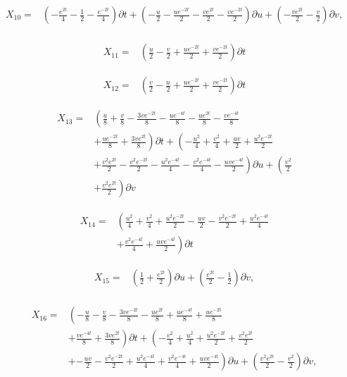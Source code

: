 \begin{align*}
X_{10}=&\left(- \frac{e^{2 t}}{4} - \frac{1}{2} - \frac{e^{- 2 t}}{4} \right)\partial t+\left(- \frac{u}{2} - \frac{u e^{- 2 t}}{2} - \frac{v e^{2 t}}{2} - \frac{v e^{- 2 t}}{2} \right)\partial u+\left(- \frac{v e^{2 t}}{2} - \frac{v}{2} \right)\partial v,\\
\end{align*}

\begin{align*}
X_{11}=&\left(\frac{u}{2}- \frac{v}{2}+\frac{u e^{- 2 t}}{2}+\frac{v e^{- 2 t}}{2} \right)\partial t
\end{align*}

\begin{align*}
X_{12}=&\left(\frac{v}{2}- \frac{u}{2}+\frac{u e^{- 2 t}}{2}+\frac{v e^{- 2 t}}{2} \right)\partial t
\end{align*}

\begin{align*}
X_{13}=&\left(\frac{u}{8}+\frac{v}{8}- \frac{3 v e^{- 2 t}}{8}- \frac{u e^{- 4 t}}{8}- \frac{u e^{2 t}}{8}- \frac{v e^{- 4 t}}{8}\right.\\
&+\left.\frac{u e^{- 2 t}}{8}+\frac{3 v e^{2 t}}{8} \right)\partial t+\left(- \frac{u^{2}}{4}+\frac{v^{2}}{4}+\frac{u v}{2}+\frac{u^{2} e^{- 2 t}}{2}\right.\\
&+\left.\frac{v^{2} e^{2 t}}{2}- \frac{v^{2} e^{- 2 t}}{2}- \frac{u^{2} e^{- 4 t}}{4}- \frac{v^{2} e^{- 4 t}}{4}- \frac{u v e^{- 4 t}}{2} \right)\partial u+\left(\frac{v^{2}}{2}\right.\\
&+\left.\frac{v^{2} e^{2 t}}{2} \right)\partial v
\end{align*}

\begin{align*}
X_{14}=&\left(\frac{u^{2}}{4}+\frac{v^{2}}{4}+\frac{u^{2} e^{- 2 t}}{2}- \frac{u v}{2}- \frac{v^{2} e^{- 2 t}}{2}+\frac{u^{2} e^{- 4 t}}{4}\right.\\
&+\left.\frac{v^{2} e^{- 4 t}}{4}+\frac{u v e^{- 4 t}}{2} \right)\partial t
\end{align*}

\begin{align*}
X_{15}=&\left(\frac{1}{2}+\frac{e^{2 t}}{2} \right)\partial u+\left(\frac{e^{2 t}}{2} - \frac{1}{2} \right)\partial v,\\
\end{align*}

\begin{align*}
X_{16}=&\left(- \frac{u}{8}- \frac{v}{8}- \frac{3 v e^{- 2 t}}{8}- \frac{u e^{2 t}}{8}+\frac{u e^{- 4 t}}{8}+\frac{u e^{- 2 t}}{8}\right.\\
&+\left.\frac{v e^{- 4 t}}{8}+\frac{3 v e^{2 t}}{8} \right)\partial t+\left(- \frac{v^{2}}{4}+\frac{u^{2}}{4}+\frac{u^{2} e^{- 2 t}}{2}+\frac{v^{2} e^{2 t}}{2}\right.\\
&+\left.- \frac{u v}{2}- \frac{v^{2} e^{- 2 t}}{2}+\frac{u^{2} e^{- 4 t}}{4}+\frac{v^{2} e^{- 4 t}}{4}+\frac{u v e^{- 4 t}}{2} \right)\partial u+\left(\frac{v^{2} e^{2 t}}{2} - \frac{v^{2}}{2} \right)\partial v,\\
\end{align*}

